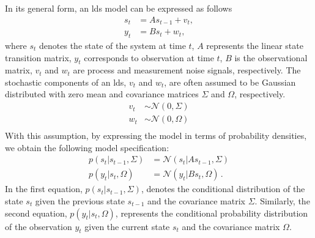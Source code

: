 In its general form, an \ac{lds} model can be expressed as follows \begin{equation}
  \label{eq:sim:lds}
  \begin{split} 
    s_t &= A s_{t - 1} + v_{t}, \\%
    y_t &= B s_t + w_{t}, %
  \end{split}
\end{equation} 
where $s_t$ denotes the state of the system at time $t$, $A$ represents the linear state transition
matrix, $y_t$ corresponds to observation at time $t$, $B$ is the observational matrix, $v_t$ and $w_t$ are process and measurement noise signals, respectively.
The stochastic components of an \ac{lds}, $v_{t}$ and $w_{t}$, are often assumed to be
Gaussian distributed with zero mean and covariance matrices $\Sigma$ and $\Omega$,
respectively.
\begin{equation}
    \label{eq:sim:lds-stochastic-gaussian}
    \begin{split}
        v_{t} &\sim \mathcal{N}(0, \Sigma) \\
        w_{t} &\sim \mathcal{N}(0, \Omega) \\
    \end{split}
\end{equation}
With this assumption, by expressing the model in terms of probability densities, we obtain the following model specification:
\begin{equation}
  \label{eq:sim:lds_probabilities}
  \begin{aligned}
    p(s_t\vert s_{t-1}, \Sigma) & = \mathcal{N}(s_t \vert A s_{t-1}, \Sigma) \\ 
    p(y_t\vert s_{t}, \Omega) & = \mathcal{N}(y_t \vert B s_{t}, \Omega)\,.
  \end{aligned}
\end{equation} 
In the first equation, $p(s_t\vert s_{t-1}, \Sigma)$, denotes the conditional distribution of the state $s_t$ given the previous state $s_{t-1}$ and the covariance matrix $\Sigma$.
Similarly, the second equation, $p(y_t\vert s_{t}, \Omega)$, represents the conditional probability distribution 
of the observation $y_t$ given the current state $s_t$ and the covariance matrix $\Omega$.

